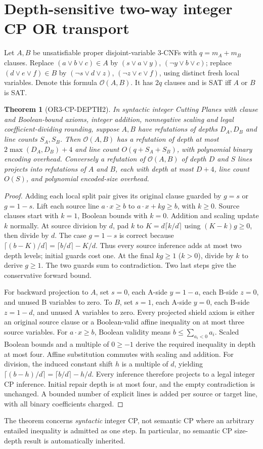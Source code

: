 \documentclass[11pt]{article}
\newtheorem{theorem}{Theorem}
\begin{document}
\section{Depth-sensitive two-way integer CP OR transport}
Let $A,B$ be unsatisfiable proper disjoint-variable 3-CNFs with $q=m_A+m_B$ clauses. Replace $(a\vee b\vee c)\in A$ by $(s\vee a\vee y)$, $(\neg y\vee b\vee c)$; replace $(d\vee e\vee f)\in B$ by $(\neg s\vee d\vee z)$, $(\neg z\vee e\vee f)$, using distinct fresh local variables. Denote this formula $\mathcal O(A,B)$. It has $2q$ clauses and is SAT iff $A$ or $B$ is SAT.

\begin{theorem}[OR3-CP-DEPTH2]
In syntactic integer Cutting Planes with clause and Boolean-bound axioms, integer addition, nonnegative scaling and legal coefficient-dividing rounding, suppose $A,B$ have refutations of depths $D_A,D_B$ and line counts $S_A,S_B$. Then $\mathcal O(A,B)$ has a refutation of depth at most $2\max(D_A,D_B)+4$ and line count $O(q+S_A+S_B)$, with polynomial binary encoding overhead. Conversely a refutation of $\mathcal O(A,B)$ of depth $D$ and $S$ lines projects into refutations of $A$ and $B$, each with depth at most $D+4$, line count $O(S)$, and polynomial encoded-size overhead.
\end{theorem}
\begin{proof}
Adding each local split pair gives its original clause guarded by $g=s$ or $g=1-s$. Lift each source line $a\cdot x\ge b$ to $a\cdot x+kg\ge b$, with $k\ge0$. Source clauses start with $k=1$, Boolean bounds with $k=0$. Addition and scaling update $k$ normally. At source division by $d$, pad $k$ to $K=d\lceil k/d\rceil$ using $(K-k)g\ge0$, then divide by $d$. The case $g=1-s$ is correct because $\lceil(b-K)/d\rceil=\lceil b/d\rceil-K/d$. Thus every source inference adds at most two depth levels; initial guards cost one. At the final $kg\ge1$ ($k>0$), divide by $k$ to derive $g\ge1$. The two guards sum to contradiction. Two last steps give the conservative forward bound.

For backward projection to $A$, set $s=0$, each A-side $y=1-a$, each B-side $z=0$, and unused B variables to zero. To $B$, set $s=1$, each A-side $y=0$, each B-side $z=1-d$, and unused A variables to zero. Every projected shield axiom is either an original source clause or a Boolean-valid affine inequality on at most three source variables. For $a\cdot x\ge b$, Boolean validity means $b\le\sum_{a_i<0}a_i$. Scaled Boolean bounds and a multiple of $0\ge-1$ derive the required inequality in depth at most four. Affine substitution commutes with scaling and addition. For division, the induced constant shift $h$ is a multiple of $d$, yielding $\lceil(b-h)/d\rceil=\lceil b/d\rceil-h/d$. Every inference therefore projects to a legal integer CP inference. Initial repair depth is at most four, and the empty contradiction is unchanged. A bounded number of explicit lines is added per source or target line, with all binary coefficients charged.
\end{proof}
The theorem concerns \emph{syntactic} integer CP, not semantic CP where an arbitrary entailed inequality is admitted as one step. In particular, no semantic CP size-depth result is automatically inherited.
\end{document}
